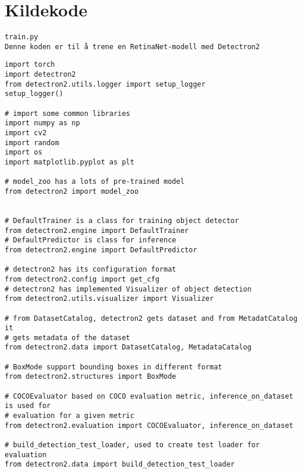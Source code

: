 \setcounter{page}{1}

\pagestyle{fancy}

\section*{Kildekode}
\addtocounter{section}{1}
\label{appendix:code}

\begin{verbatim}
train.py
Denne koden er til å trene en RetinaNet-modell med Detectron2
\end{verbatim}


\label{lst:load}
\begin{verbatim}
import torch
import detectron2
from detectron2.utils.logger import setup_logger
setup_logger()

# import some common libraries
import numpy as np
import cv2
import random
import os
import matplotlib.pyplot as plt

# model_zoo has a lots of pre-trained model
from detectron2 import model_zoo


# DefaultTrainer is a class for training object detector
from detectron2.engine import DefaultTrainer
# DefaultPredictor is class for inference
from detectron2.engine import DefaultPredictor

# detectron2 has its configuration format
from detectron2.config import get_cfg
# detectron2 has implemented Visualizer of object detection
from detectron2.utils.visualizer import Visualizer

# from DatasetCatalog, detectron2 gets dataset and from MetadatCatalog it
# gets metadata of the dataset
from detectron2.data import DatasetCatalog, MetadataCatalog

# BoxMode support bounding boxes in different format
from detectron2.structures import BoxMode

# COCOEvaluator based on COCO evaluation metric, inference_on_dataset is used for
# evaluation for a given metric
from detectron2.evaluation import COCOEvaluator, inference_on_dataset

# build_detection_test_loader, used to create test loader for evaluation
from detectron2.data import build_detection_test_loader
\end{verbatim}

